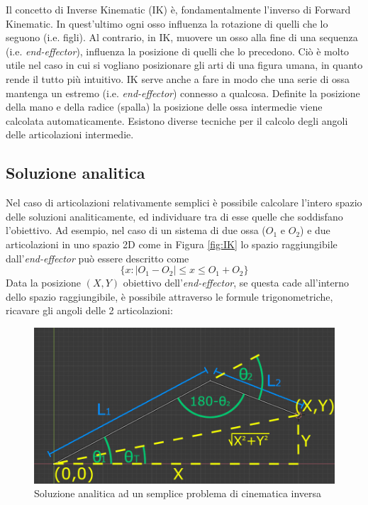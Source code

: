 Il concetto di Inverse Kinematic (IK) è, fondamentalmente l'inverso di Forward Kinematic. In quest'ultimo ogni osso influenza la rotazione di quelli che lo seguono (i.e. figli).
Al contrario, in IK, muovere un osso alla fine di una sequenza (i.e. \emph{end-effector}), influenza la posizione di quelli che lo precedono.
Ciò è molto utile nel caso in cui si vogliano posizionare gli arti di una figura umana, in quanto rende il tutto più intuitivo.
IK serve anche a fare in modo che una serie di ossa mantenga un estremo (i.e. \emph{end-effector}) connesso a qualcosa.
Definite la posizione della mano e della radice (spalla) la posizione delle ossa intermedie viene calcolata automaticamente.
Esistono diverse tecniche per il calcolo degli angoli delle articolazioni intermedie.

\subsection{Soluzione analitica}
Nel caso di articolazioni relativamente semplici è possibile calcolare l'intero spazio delle soluzioni analiticamente, ed individuare tra di esse quelle che soddisfano l'obiettivo.
Ad esempio, nel caso di un sistema di due ossa ($O_1$ e $O_2$) e due articolazioni in uno spazio 2D come in Figura \ref{fig:IK} lo spazio raggiungibile dall'\emph{end-effector} può essere descritto come 
\begin{equation*}
    \{x: |O_1-O_2| \leq x \leq O_1+O_2\}
\end{equation*}
\newpage
Data la posizione $(X,Y)$ obiettivo dell'\emph{end-effector}, se questa cade all'interno dello spazio raggiungibile, è possibile attraverso le formule trigonometriche, ricavare gli angoli delle 2 articolazioni:

\begin{figure}[H]
\centering
\includegraphics[width=.8\textwidth]{Figures/15}
\decoRule
\caption[Soluzione analitica]{Soluzione analitica ad un semplice problema di cinematica inversa}
\label{fig:5.16}
\end{figure}

